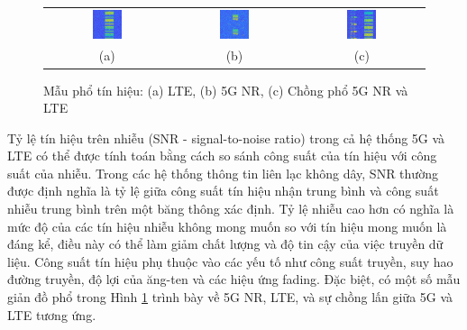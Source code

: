 \begin{figure}[h]
    \centering
    \footnotesize
    \begin{tabular}{ccc}
        \includegraphics[width=0.25\textwidth]{fig/LTE_frame_0.png}  & \includegraphics[width=0.25\textwidth]{fig/NR_frame_1506.png} &
        \includegraphics[width=0.25\textwidth]
        {fig/LTE_NR_frame_0.png} 
        \\
        (a) & (b) & (c)
    \end{tabular}
    \caption{Mẫu phổ tín hiệu: (a) LTE, (b) 5G NR, (c) Chồng phổ 5G NR và LTE}
    \label{fig_SignalModel}
\end{figure}

Tỷ lệ tín hiệu trên nhiễu (SNR - signal-to-noise ratio) trong cả hệ thống 5G và LTE có thể được tính toán bằng cách so sánh công suất của tín hiệu với công suất của nhiễu. Trong các hệ thống thông tin liên lạc không dây, SNR thường được định nghĩa là tỷ lệ giữa công suất tín hiệu nhận trung bình và công suất nhiễu trung bình trên một băng thông xác định. Tỷ lệ nhiễu cao hơn có nghĩa là mức độ của các tín hiệu nhiễu không mong muốn so với tín hiệu mong muốn là đáng kể, điều này có thể làm giảm chất lượng và độ tin cậy của việc truyền dữ liệu. Công suất tín hiệu phụ thuộc vào các yếu tố như công suất truyền, suy hao đường truyền, độ lợi của ăng-ten và các hiệu ứng fading. Đặc biệt, có một số mẫu giản đồ phổ trong Hình \ref{fig_SignalModel} trình bày về 5G NR, LTE, và sự chồng lấn giữa 5G và LTE tương ứng.

